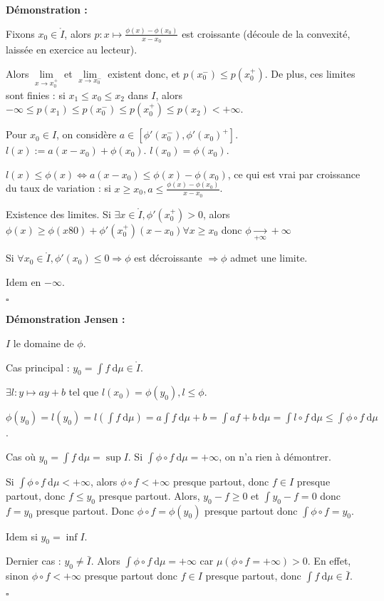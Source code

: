 \documentclass[10pt,a4paper,notitlepage ]{report}
\newcommand{\dd}{\ \mathrm d}
\newcommand{\1}{\mathds 1}
\newcounter{th}
\newenvironment{demo}[1][]{

	\textbf{Démonstration #1 :}
}{\begin{flushright}
	$\square$
\end{flushright}
}
\begin{document}
\begin{demo}
	Fixons $x_0 \in \mathring I$, alors $p:x\mapsto \frac{\phi(x) - \phi(x_0)}{x-x_0}$ est croissante (découle de la convexité, laissée en exercice au lecteur).
	
	Alors $\underset{x\rightarrow x_0^+} \lim $ et $\underset{x \rightarrow x_0^-}\lim $ existent donc, et $p(x_0^-) \le p(x_0^+)$. De plus, ces limites sont finies : si $x_1 \le x_0 \le x_2$ dans $I$, alors $-\infty\le p(x_1) \le p(x_0^-) \le p(x_0^+) \le p(x_2) < +\infty$.
	
	Pour $x_0 \in I$, on considère $a\in [\phi'(x_0^-), \phi'(x_0)^+]$.
	$l(x) := a(x-x_0) +\phi(x_0)$. $l(x_0) = \phi(x_0)$.
	
	$l(x) \le \phi(x) \Leftrightarrow a(x - x_0) \le \phi(x) - \phi(x_0)$, ce qui est vrai par croissance du taux de variation : si $x\ge x_0, a\le \frac{\phi(x)-\phi(x_0)}{x-x_0}$.
	
	Existence des limites.
	Si $\exists x\in \mathring I, \phi'(x_0^+) > 0$, alors $\phi(x) \ge \phi(x80) + \phi'(x_0^+)(x-x_0) \forall x\ge x_0$ donc $\phi \underset {+\infty} \rightarrow +\infty$
	
	Si $\forall x_0 \in \mathring I, \phi'(x_0) \le 0 \Rightarrow \phi$ est décroissante $\Rightarrow \phi$ admet une limite.
	
	Idem en $-\infty$.
\end{demo}

\begin{demo}[Jensen]
	$I$ le domaine de $\phi$.
	
	Cas principal : $y_0 = \int f\dd\mu \in \mathring I$.
	
	$\exists l : y \mapsto ay+b$ tel que $l(x_0) = \phi(y_0), l\le \phi$.
	
	$\phi(y_0) = l(y_0) = l\left(\int f\dd\mu\right) = a \int f\dd\mu + b = \int af+b\dd\mu = \int l\circ f \dd\mu \le \int \phi\circ f \dd\mu$.
	
	Cas où $y_0 = \int f\dd\mu = \sup I$. Si $\int \phi \circ f \dd\mu = +\infty$, on n'a rien à démontrer.
	
	Si $\int \phi\circ f \dd\mu < + \infty$, alors $\phi\circ f < +\infty$ presque partout, donc $f\in I$ presque partout, donc $f\le y_0$ presque partout. Alors, $y_0-f \ge 0$ et $\int y_0-f = 0$ donc $f=y_0$ presque partout. Donc $\phi\circ f = \phi(y_0)$ presque partout donc $\int \phi \circ f = y_0$.
	
	Idem si $y_0 = \inf I$.
	
	Dernier cas : $y_0 \neq \bar I$.
	Alors $\int \phi \circ f \dd \mu = +\infty$ car $\mu(\phi\circ f = +\infty) > 0$. En effet, sinon $\phi\circ f < +\infty$ presque partout donc $f\in I$ presque partout, donc $\int f\dd\mu \in \bar I$.
\end{demo}
\end{document}
